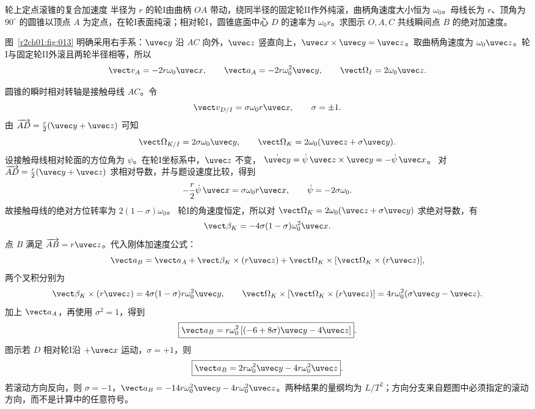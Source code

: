 \begin{practicebox}{轮上定点滚锥的复合加速度}
半径为 $r$ 的轮I由曲柄 $OA$ 带动，绕同半径的固定轮II作外纯滚，曲柄角速度大小恒为 $\omega_0$。母线长为 $r$、顶角为 $90^\circ$ 的圆锥以顶点 $A$ 为定点，在轮I表面纯滚；相对轮I，圆锥底面中心 $D$ 的速率为 $\omega_0r$。求图示 $O,A,C$ 共线瞬间点 $B$ 的绝对加速度。
\label{r2ch01:pr:008}
\begin{solution}
图~\ref{r2ch01:fig:013} 明确采用右手系：$\uvec y$ 沿 $AC$ 向外，$\uvec z$ 竖直向上，$\uvec x\times\uvec y=\uvec z$。取曲柄角速度为 $\omega_0\uvec z$。轮I与固定轮II外滚且两轮半径相等，所以
\[
  \vect v_A=-2r\omega_0\uvec x,\qquad
  \vect a_A=-2r\omega_0^2\uvec y,\qquad
  \vect\Omega_I=2\omega_0\uvec z.
\]

\figConeRolling

圆锥的瞬时相对转轴是接触母线 $AC$。令
\[
  \vect v_{D/I}=\sigma\omega_0r\uvec x,\qquad \sigma=\pm1.
\]
由 $\overrightarrow{AD}=\tfrac r2(\uvec y+\uvec z)$ 可知
\[
  \vect\Omega_{K/I}=2\sigma\omega_0\uvec y,\qquad
  \vect\Omega_K=2\omega_0(\uvec z+\sigma\uvec y).
\]
设接触母线相对轮面的方位角为 $\psi$。在轮I坐标系中，$\uvec z$ 不变，
$\dot{\uvec y}=\dot\psi\,\uvec z\times\uvec y=-\dot\psi\,\uvec x$。
对 $\overrightarrow{AD}=\tfrac r2(\uvec y+\uvec z)$ 求相对导数，并与题设速度比较，得到
\[
 -\frac r2\dot\psi\,\uvec x=\sigma\omega_0r\uvec x,
 \qquad \dot\psi=-2\sigma\omega_0.
\]
故接触母线的绝对方位转率为 $2(1-\sigma)\omega_0$。
轮I的角速度恒定，所以对 $\vect\Omega_K=2\omega_0(\uvec z+\sigma\uvec y)$ 求绝对导数，有
\[
  \vect\beta_K=-4\sigma(1-\sigma)\omega_0^2\uvec x.
\]
点 $B$ 满足 $\overrightarrow{AB}=r\uvec z$。代入刚体加速度公式：
\[
  \vect a_B=\vect a_A+\vect\beta_K\times(r\uvec z)
  +\vect\Omega_K\times[\vect\Omega_K\times(r\uvec z)],
\]
两个叉积分别为
\[
 \vect\beta_K\times(r\uvec z)=4\sigma(1-\sigma)r\omega_0^2\uvec y,
 \qquad
 \vect\Omega_K\times[\vect\Omega_K\times(r\uvec z)]
   =4r\omega_0^2(\sigma\uvec y-\uvec z).
\]
加上 $\vect a_A$，再使用 $\sigma^2=1$，得到
\[
  \boxed{\vect a_B=r\omega_0^2
  \left[(-6+8\sigma)\uvec y-4\uvec z\right]}.
\]
图示若 $D$ 相对轮I沿 $+\uvec x$ 运动，$\sigma=+1$，则
\[
  \boxed{\vect a_B=2r\omega_0^2\uvec y-4r\omega_0^2\uvec z}.
\]
若滚动方向反向，则 $\sigma=-1$，$\vect a_B=-14r\omega_0^2\uvec y-4r\omega_0^2\uvec z$。两种结果的量纲均为 $L/T^2$；方向分支来自题图中必须指定的滚动方向，而不是计算中的任意符号。
\end{solution}
\end{practicebox}

